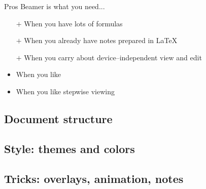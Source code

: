 \begin{frame}{Pros}\relax
    Beamer is what you need...
     \begin{itemize}
        \item[$+$] When you have lots of {\csk formulas} %
        \item[$+$] When you {\csk already} have notes prepared in \LaTeX %
        \item[$+$] When you carry about {\csk device--independent} view and edit %
        \item<2->[$+$] When you like 
        \item<3>[$+$] When you like {\csk stepwise viewing}
    \end{itemize}
\end{frame}


\subsection{Document structure}


\subsection{Style: themes and colors}


\subsection{Tricks: overlays, animation, notes}

